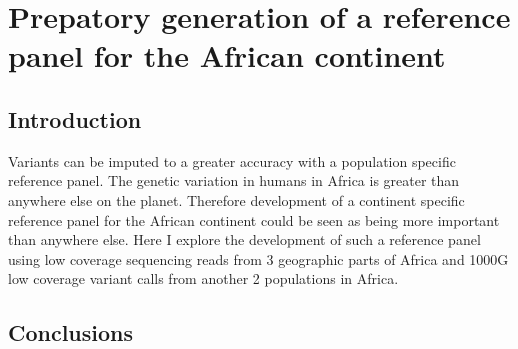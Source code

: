 \section{Prepatory generation of a reference panel for the African continent}
\label{sec:reference_panel}

\subsection{Introduction}
Variants can be imputed to a greater accuracy with a population specific reference panel.\cite{Jallow2009} The genetic variation in humans in Africa is greater than anywhere else on the planet.\cite{Gurdasani2015} Therefore development of a continent specific reference panel for the African continent could be seen as being more important than anywhere else. Here I explore the development of such a reference panel using low coverage sequencing reads from 3 geographic parts of Africa and \gls{1000G}\cite{1000G2012} low coverage variant calls from another 2 populations in Africa.





\subsection{Conclusions}
